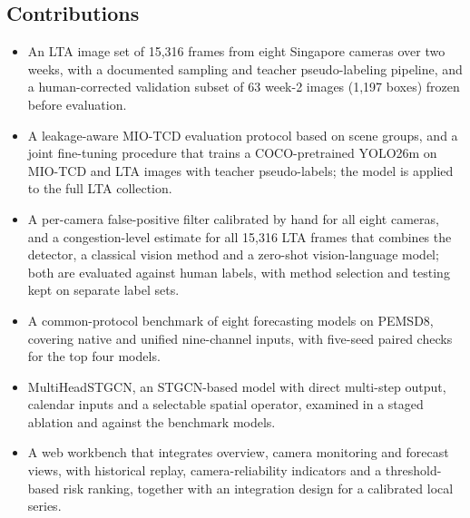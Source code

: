 \subsection{Contributions}\label{sec:intro-contributions}

\begin{itemize}
  \item An LTA image set of 15,316 frames from eight Singapore cameras over two
        weeks, with a documented sampling and teacher pseudo-labeling pipeline,
        and a human-corrected validation subset of 63 week-2 images (1,197
        boxes) frozen before evaluation.
  \item A leakage-aware MIO-TCD evaluation protocol based on scene groups, and
        a joint fine-tuning procedure that trains a COCO-pretrained YOLO26m on
        MIO-TCD and LTA images with teacher pseudo-labels; the model is applied
        to the full LTA collection.
  \item A per-camera false-positive filter calibrated by hand for all eight
        cameras, and a congestion-level estimate for all 15,316 LTA frames that
        combines the detector, a classical vision method and a zero-shot
        vision-language model; both are evaluated against human labels, with
        method selection and testing kept on separate label sets.
  \item A common-protocol benchmark of eight forecasting models on PEMSD8,
        covering native and unified nine-channel inputs, with five-seed paired
        checks for the top four models.
  \item MultiHeadSTGCN, an STGCN-based model with direct multi-step output,
        calendar inputs and a selectable spatial operator, examined in a staged
        ablation and against the benchmark models.
  \item A web workbench that integrates overview, camera monitoring and
        forecast views, with historical replay, camera-reliability indicators
        and a threshold-based risk ranking, together with an integration design
        for a calibrated local series.
\end{itemize}
